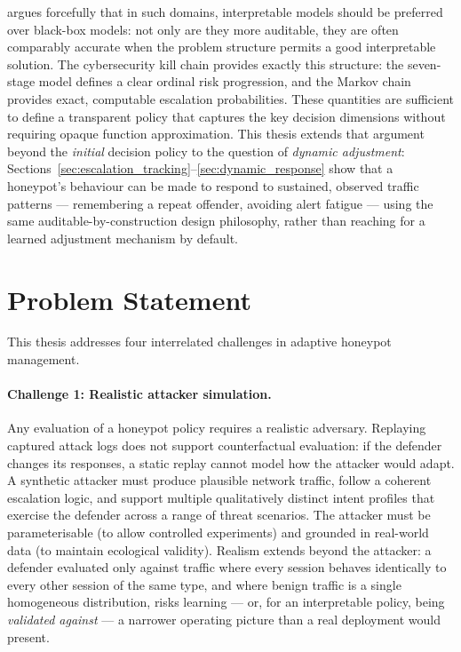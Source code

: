 \citet{rudin2019stop} argues forcefully that in such domains, interpretable
models should be preferred over black-box models: not only are they more
auditable, they are often comparably accurate when the problem structure
permits a good interpretable solution.
The cybersecurity kill chain provides exactly this structure: the seven-stage
model defines a clear ordinal risk progression, and the Markov chain provides
exact, computable escalation probabilities.
These quantities are sufficient to define a transparent policy that captures
the key decision dimensions without requiring opaque function approximation.
This thesis extends that argument beyond the \emph{initial} decision policy
to the question of \emph{dynamic adjustment}:
Sections~\ref{sec:escalation_tracking}--\ref{sec:dynamic_response} show that
a honeypot's behaviour can be made to respond to sustained, observed traffic
patterns --- remembering a repeat offender, avoiding alert fatigue --- using
the same auditable-by-construction design philosophy, rather than reaching
for a learned adjustment mechanism by default.

\section{Problem Statement}

This thesis addresses four interrelated challenges in adaptive honeypot
management.

\paragraph{Challenge 1: Realistic attacker simulation.}
Any evaluation of a honeypot policy requires a realistic adversary.
Replaying captured attack logs does not support counterfactual evaluation:
if the defender changes its responses, a static replay cannot model how the
attacker would adapt.
A synthetic attacker must produce plausible network traffic, follow a coherent
escalation logic, and support multiple qualitatively distinct intent profiles
that exercise the defender across a range of threat scenarios.
The attacker must be parameterisable (to allow controlled experiments) and
grounded in real-world data (to maintain ecological validity).
Realism extends beyond the attacker: a defender evaluated only against
traffic where every session behaves identically to every other session of
the same type, and where benign traffic is a single homogeneous distribution,
risks learning --- or, for an interpretable policy, being \emph{validated
against} --- a narrower operating picture than a real deployment would
present.

